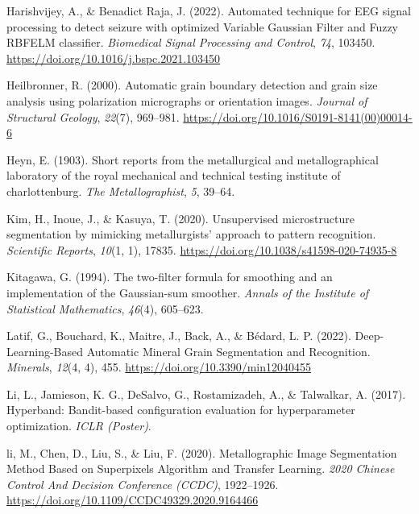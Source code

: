 \documentclass[
  12pt,
]{book}
\newlength{\cslhangindent}
\newlength{\cslentryspacingunit} %
\newenvironment{CSLReferences}[2] %
 {%
  \setlength{\parindent}{0pt}
  \ifodd #1
  \let\oldpar\par
  \def\par{\hangindent=\cslhangindent\oldpar}
  \fi
  \setlength{\parskip}{#2\cslentryspacingunit}
 }%
 {}
\begin{document}
\begin{CSLReferences}{1}{0}
\leavevmode{}%
Harishvijey, A., \& Benadict Raja, J. (2022). Automated technique for {EEG} signal processing to detect seizure with optimized {Variable Gaussian Filter} and {Fuzzy RBFELM} classifier. \emph{Biomedical Signal Processing and Control}, \emph{74}, 103450. \url{https://doi.org/10.1016/j.bspc.2021.103450}

\leavevmode{}%
Heilbronner, R. (2000). Automatic grain boundary detection and grain size analysis using polarization micrographs or orientation images. \emph{Journal of Structural Geology}, \emph{22}(7), 969--981. \url{https://doi.org/10.1016/S0191-8141(00)00014-6}

\leavevmode{}%
Heyn, E. (1903). Short reports from the metallurgical and metallographical laboratory of the royal mechanical and technical testing institute of charlottenburg. \emph{The Metallographist}, \emph{5}, 39--64.

\leavevmode{}%
Kim, H., Inoue, J., \& Kasuya, T. (2020). Unsupervised microstructure segmentation by mimicking metallurgists' approach to pattern recognition. \emph{Scientific Reports}, \emph{10}(1, 1), 17835. \url{https://doi.org/10.1038/s41598-020-74935-8}

\leavevmode{}%
Kitagawa, G. (1994). The two-filter formula for smoothing and an implementation of the {Gaussian-sum} smoother. \emph{Annals of the Institute of Statistical Mathematics}, \emph{46}(4), 605--623.

\leavevmode{}%
Latif, G., Bouchard, K., Maitre, J., Back, A., \& Bédard, L. P. (2022). Deep-{Learning-Based Automatic Mineral Grain Segmentation} and {Recognition}. \emph{Minerals}, \emph{12}(4, 4), 455. \url{https://doi.org/10.3390/min12040455}

\leavevmode{}%
Li, L., Jamieson, K. G., DeSalvo, G., Rostamizadeh, A., \& Talwalkar, A. (2017). Hyperband: {Bandit-based} configuration evaluation for hyperparameter optimization. \emph{{ICLR} ({Poster})}.

\leavevmode{}%
li, M., Chen, D., Liu, S., \& Liu, F. (2020). Metallographic {Image Segmentation Method Based} on {Superpixels Algorithm} and {Transfer Learning}. \emph{2020 {Chinese Control And Decision Conference} ({CCDC})}, 1922--1926. \url{https://doi.org/10.1109/CCDC49329.2020.9164466}


\end{CSLReferences}
\end{document}
